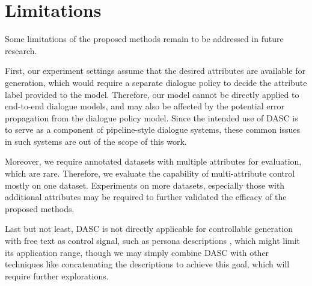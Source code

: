 \section*{Limitations}

Some limitations of the proposed methods remain to be addressed 
in future research.

First, our experiment settings assume that the desired attributes are available for generation, which would require a separate dialogue policy to decide the 
attribute label provided to the model. Therefore, our model cannot be 
directly applied to end-to-end dialogue models, and may also be affected by 
the potential error propagation from the dialogue policy model. Since the intended use of DASC is to serve as a component of pipeline-style dialogue systems, these common issues in such systems are out of the scope of this work. 

Moreover, we require annotated datasets with multiple attributes for evaluation, which are rare. Therefore, we evaluate the capability of multi-attribute control mostly on one dataset. Experiments on more datasets, especially those with additional attributes may be required to further validated the efficacy of the proposed methods.

Last but not least, DASC is not directly applicable for controllable generation with free text as control signal, such as persona descriptions \cite{zhang2018personalizing}, which might limit its application range, though we may simply combine DASC with other techniques like concatenating the descriptions to achieve this goal, which will require further explorations. 

